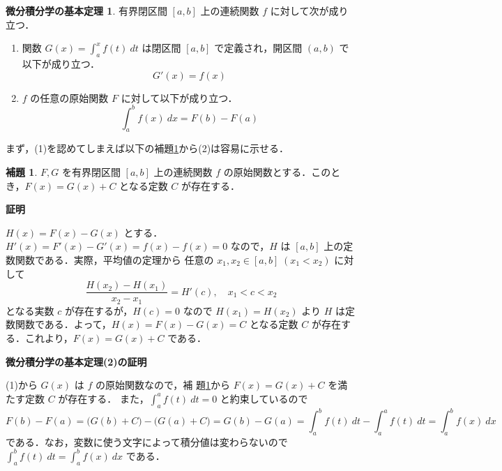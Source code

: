\documentclass[10pt, uplatex, dvipdfmx]{jsarticle}
\makeatletter
\renewenvironment{proof}[1][\proofname]{\par
  \pushQED{\qed}%
  \normalfont \topsep6\p@\@plus6\p@\relax
  \trivlist
  \item\relax
  {\bfseries
  #1\@addpunct{.}}\hspace\labelsep\ignorespaces
}{%
  \popQED\endtrivlist\@endpefalse
}
\theoremstyle{definition}
\newtheorem{lemma}[theorem]{補題}
\renewcommand{\proofname}{\textbf{証明}}
\newtheorem*{fundamental}{\textbf{微分積分学の基本定理}}
\numberwithin{equation}{section}
\newcommand{\ds}{\displaystyle}
\makeatother
\begin{document}
\begin{fundamental}
  有界閉区間 $[a,b]$ 上の連続関数 $f$ に対して次が成り立つ．
  \begin{enumerate}[(1)]
  \item 関数 $\ds G(x) = \int_{a}^{x} f(t)\ dt$ は閉区間 $[a,b]$ で定義され，開区間 $(a,b)$ で以下が成り立つ．
    \[
      G'(x) = f(x)
    \]
    
  \item $f$ の任意の原始関数 $F$ に対して以下が成り立つ．
    \[
      \int_{a}^{b} f(x) \ dx = F(b) - F(a)
    \]
  \end{enumerate}
\end{fundamental}

\vspace{1zh}

まず，(1)を認めてしまえば以下の補題\ref{lem:uptoC}から(2)は容易に示せる．

\begin{lemma}\label{lem:uptoC}
  $F,G$ を有界閉区間 $[a,b]$ 上の連続関数 $f$ の原始関数とする．このと
  き，$F(x) = G(x) +C$ となる定数 $C$ が存在する．
\end{lemma}

\begin{proof}
  $H(x) = F(x) - G(x)$ とする．$H'(x) = F'(x) - G'(x) = f(x) - f(x) =
  0$ なので，$H$ は $[a,b]$ 上の定数関数である．実際，平均値の定理から
  任意の $x_1 ,x_2 \in [a,b] \; ( x_1 < x_2)$ に対して
  \[
    \frac{H(x_2) - H(x_1)}{x_2-x_1} = H'(c) , \quad x_1 < c < x_2
  \]
  となる実数 $c$ が存在するが，$H(c)=0$ なので $H(x_1) =
  H(x_2)$ より $H$ は定数関数である．よって，$H(x) = F(x) - G(x) = C$
  となる定数 $C$ が存在する．これより，$F(x) = G(x) +C$ である．
\end{proof}

\vspace{1zh}

\begin{proof}[微分積分学の基本定理(2)の証明]
  (1)から $G(x)$ は $f$ の原始関数なので，補
  題\ref{lem:uptoC}から $F(x) = G(x) +C$ を満たす定数 $C$ が存在する．
  また，$\ds \int_{a}^{a} f(t) \ dt =0$ と約束しているので
  \[
    F(b) - F(a) = \Big(G(b) +C \Big) - \Big(G(a) +C\Big) = G(b) - G(a)
    = \int_{a}^{b} f(t) \ dt - \int_{a}^{a} f(t) \ dt = \int_{a}^{b} f(x) \ dx
  \]
  である．なお，変数に使う文字によって積分値は変わらないので
  $\ds \int_{a}^{b} f(t) \ dt = \int_{a}^{b} f(x) \ dx$ である．
\end{proof}

\newpage
\end{document}
